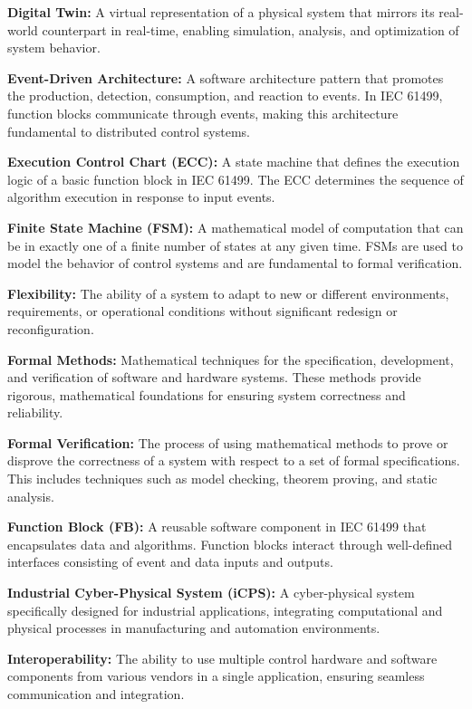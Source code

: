 \textbf{Digital Twin:} A virtual representation of a physical system that mirrors its real-world counterpart in real-time, enabling simulation, analysis, and optimization of system behavior.

\textbf{Event-Driven Architecture:} A software architecture pattern that promotes the production, detection, consumption, and reaction to events. In IEC 61499, function blocks communicate through events, making this architecture fundamental to distributed control systems.

\textbf{Execution Control Chart (ECC):} A state machine that defines the execution logic of a basic function block in IEC 61499. The ECC determines the sequence of algorithm execution in response to input events.

\textbf{Finite State Machine (FSM):} A mathematical model of computation that can be in exactly one of a finite number of states at any given time. FSMs are used to model the behavior of control systems and are fundamental to formal verification.

\textbf{Flexibility:} The ability of a system to adapt to new or different environments, requirements, or operational conditions without significant redesign or reconfiguration.

\textbf{Formal Methods:} Mathematical techniques for the specification, development, and verification of software and hardware systems. These methods provide rigorous, mathematical foundations for ensuring system correctness and reliability.

\textbf{Formal Verification:} The process of using mathematical methods to prove or disprove the correctness of a system with respect to a set of formal specifications. This includes techniques such as model checking, theorem proving, and static analysis.

\textbf{Function Block (FB):} A reusable software component in IEC 61499 that encapsulates data and algorithms. Function blocks interact through well-defined interfaces consisting of event and data inputs and outputs.

\textbf{Industrial Cyber-Physical System (iCPS):} A cyber-physical system specifically designed for industrial applications, integrating computational and physical processes in manufacturing and automation environments.

\textbf{Interoperability:} The ability to use multiple control hardware and software components from various vendors in a single application, ensuring seamless communication and integration.

